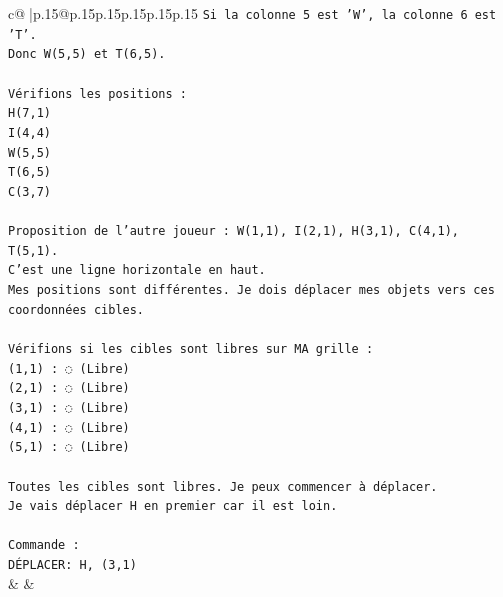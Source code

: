 \documentclass{article}
\begin{document}
{\begin{supertabular}{c@{$\;$}|p{.15\linewidth}@{}p{.15\linewidth}p{.15\linewidth}p{.15\linewidth}p{.15\linewidth}p{.15\linewidth}}
{{{\texttt{Si la colonne 5 est 'W', la colonne 6 est 'T'.} \\
\texttt{Donc W(5,5) et T(6,5).} \\
\\ 
\texttt{Vérifions les positions :} \\
\texttt{H(7,1)} \\
\texttt{I(4,4)} \\
\texttt{W(5,5)} \\
\texttt{T(6,5)} \\
\texttt{C(3,7)} \\
\\ 
\texttt{Proposition de l'autre joueur : W(1,1), I(2,1), H(3,1), C(4,1), T(5,1).} \\
\texttt{C'est une ligne horizontale en haut.} \\
\texttt{Mes positions sont différentes. Je dois déplacer mes objets vers ces coordonnées cibles.} \\
\\ 
\texttt{Vérifions si les cibles sont libres sur MA grille :} \\
\texttt{(1,1) : ◌ (Libre)} \\
\texttt{(2,1) : ◌ (Libre)} \\
\texttt{(3,1) : ◌ (Libre)} \\
\texttt{(4,1) : ◌ (Libre)} \\
\texttt{(5,1) : ◌ (Libre)} \\
\\ 
\texttt{Toutes les cibles sont libres. Je peux commencer à déplacer.} \\
\texttt{Je vais déplacer H en premier car il est loin.} \\
\\ 
\texttt{Commande :} \\
\texttt{DÉPLACER: H, (3,1)} \\
            }
        }
    }
    & & \\ \\


\end{supertabular}}
\end{document}
